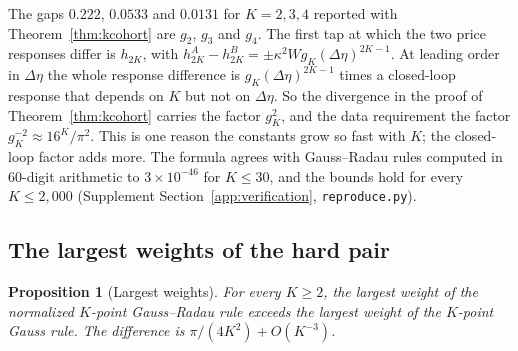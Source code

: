 \documentclass[12pt]{article}
\newtheorem{proposition}[theorem]{Proposition}
\theoremstyle{definition}
\theoremstyle{remark}
\begin{document}
The gaps $0.222$, $0.0533$ and $0.0131$ for $K=2,3,4$ reported with Theorem~\ref{thm:kcohort} are $g_2$, $g_3$ and $g_4$. The first tap at which the two price responses differ is $h_{2K}$, with $h^A_{2K}-h^B_{2K}=\pm\kappa^2Wg_K(\Delta\eta)^{2K-1}$. At leading order in $\Delta\eta$ the whole response difference is $g_K(\Delta\eta)^{2K-1}$ times a closed-loop response that depends on $K$ but not on $\Delta\eta$. So the divergence in the proof of Theorem~\ref{thm:kcohort} carries the factor $g_K^2$, and the data requirement the factor $g_K^{-2}\approx16^K/\pi^2$. This is one reason the constants grow so fast with $K$; the closed-loop factor adds more. The formula agrees with Gauss--Radau rules computed in 60-digit arithmetic to $3\times10^{-46}$ for $K\le30$, and the bounds hold for every $K\le2{,}000$ (Supplement Section~\ref{app:verification}, \nolinkurl{reproduce.py}).

\subsection{The largest weights of the hard pair}

\begin{proposition}[Largest weights]\label{prop:maxweight}
For every $K\ge2$, the largest weight of the normalized $K$-point Gauss--Radau rule exceeds the largest weight of the $K$-point Gauss rule. The difference is $\pi/(4K^2)+O(K^{-3})$.
\end{proposition}
\end{document}
